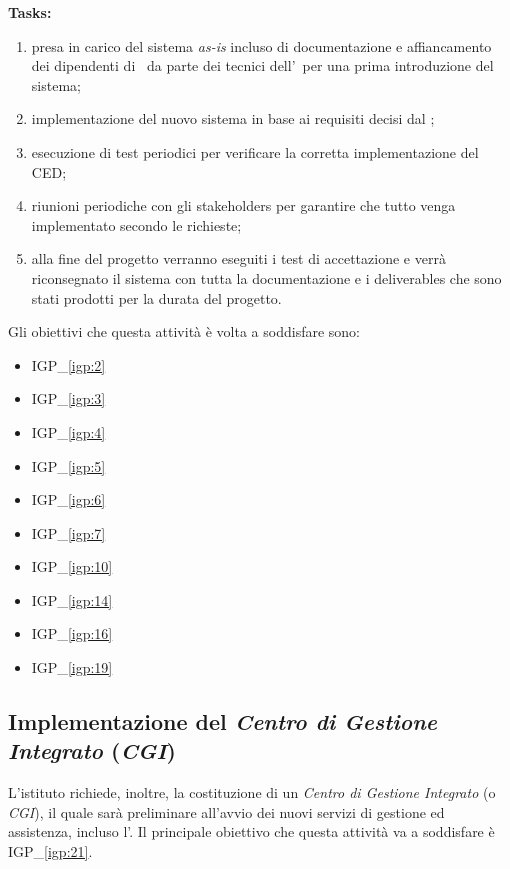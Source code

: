 		\textbf{Tasks:}
		\begin{enumerate}[noitemsep]
			\item presa in carico del sistema \textit{as-is} incluso di documentazione e affiancamento dei dipendenti di \azienda~da parte dei tecnici dell'\istituto~per una prima introduzione del sistema;
			\item implementazione del nuovo sistema in base ai requisiti decisi dal \proponente;
			\item esecuzione di test periodici per verificare la corretta implementazione del CED;
			\item riunioni periodiche con gli stakeholders per garantire che tutto venga implementato secondo le richieste;
			\item alla fine del progetto verranno eseguiti i test di accettazione e verrà riconsegnato il sistema con tutta la documentazione e i deliverables che sono stati prodotti per la durata del progetto.
		\end{enumerate}

		Gli obiettivi che questa attività è volta a soddisfare sono:
		\begin{itemize}[noitemsep]
			\renewcommand\labelitemi{--}
			\item {\color{pantone}IGP\_\ref{igp:2}}
			\item {\color{pantone}IGP\_\ref{igp:3}}
			\item {\color{pantone}IGP\_\ref{igp:4}}
			\item {\color{pantone}IGP\_\ref{igp:5}}
			\item {\color{pantone}IGP\_\ref{igp:6}}
			\item {\color{pantone}IGP\_\ref{igp:7}}
			\item {\color{pantone}IGP\_\ref{igp:10}}
			\item {\color{pantone}IGP\_\ref{igp:14}}
			\item {\color{pantone}IGP\_\ref{igp:16}}
			\item {\color{pantone}IGP\_\ref{igp:19}}
		\end{itemize}

	\subsection{Implementazione del \textit{Centro di Gestione Integrato} (\textit{CGI})}
	
		L'istituto richiede, inoltre, la costituzione di un \textit{Centro di Gestione Integrato} (o \textit{CGI}), il quale sarà preliminare all'avvio dei nuovi servizi di gestione ed assistenza, incluso l'\helpdesk.
		Il principale obiettivo che questa attività va a soddisfare è {\color{pantone}IGP\_\ref{igp:21}}.
		
